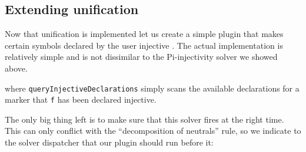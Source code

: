 \hypertarget{extending-unification}{%
\subsection{Extending unification}\label{extending-unification}}

Now that unification is implemented let us create a simple plugin that
makes certain symbols declared by the user injective
\citep{agdausersInjectiveUnificationPragma2023}. The actual
implementation is relatively simple and is not dissimilar to the
Pi-injectivity solver we showed above.

\begin{imageonly}
\begin{Shaded}
\begin{Highlighting}[]
\NormalTok{ (} \OperatorTok{:\textless{}:}
                      \OtherTok{=\textgreater{}} 
\OtherTok{=} 
  \NormalTok{ (} 
\NormalTok{              (}\NormalTok{ (}
\NormalTok{              (}\NormalTok{ (}\OtherTok{=}
  \OperatorTok{==}
   
\NormalTok{        (}
\OtherTok{\textless{}{-}}
            \NormalTok{)}
\NormalTok{        (} \NormalTok{)}
    
\end{Highlighting}
\end{Shaded}
\end{imageonly}

where \texttt{queryInjectiveDeclarations} simply scans the available
declarations for a marker that \texttt{f} has been declared injective.

The only big thing left is to make sure that this solver fires at the
right time. This can only conflict with the ``decomposition of
neutrals'' rule, so we indicate to the solver dispatcher that our plugin
should run before it:

